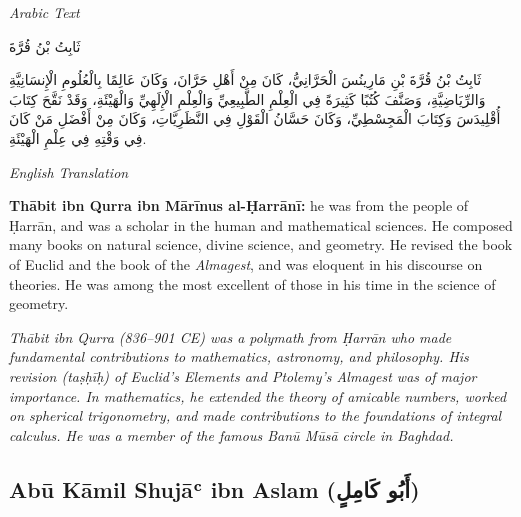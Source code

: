 \documentclass[11pt,a4paper]{article}
\def\RL#1{\beginR#1\endR}
\newcommand{\cnote}[1]{\textcolor{notecolor}{\textit{#1}}}
\newcommand{\textarabic}[1]{{\arabicfont\RL{#1}}}
\newenvironment{arabiccol}{%
  \begin{minipage}[t]{0.48\textwidth}%
  \begin{tcolorbox}[colback=leftbg,colframe=rulecolor,boxrule=0.4pt,arc=2pt,left=5pt,right=5pt,top=5pt,bottom=5pt]%
  \centering\textit{\footnotesize Arabic Text}\\[0.4em]%
  \raggedright\arabicfont\small%
}{%
  \end{tcolorbox}%
  \end{minipage}%
}
\newenvironment{englishcol}{%
  \begin{minipage}[t]{0.48\textwidth}%
  \begin{tcolorbox}[colback=rightbg,colframe=rulecolor,boxrule=0.4pt,arc=2pt,left=5pt,right=5pt,top=5pt,bottom=5pt]%
  \centering\textit{\footnotesize English Translation}\\[0.4em]%
  \raggedright\small%
}{%
  \end{tcolorbox}%
  \end{minipage}%
}
\begin{document}
\noindent
\begin{arabiccol}
\beginR
ثَابِتُ بْنُ قُرَّةَ

ثَابِتُ بْنُ قُرَّةَ بْنِ مَارِينُسَ الْحَرَّانِيُّ، كَانَ مِنْ أَهْلِ حَرَّانَ، وَكَانَ عَالِمًا بِالْعُلُومِ الْإِنسَانِيَّةِ وَالرِّيَاضِيَّةِ، وَصَنَّفَ كُتُبًا كَثِيرَةً فِي الْعِلْمِ الطَّبِيعِيِّ وَالْعِلْمِ الْإِلَهِيِّ وَالْهَيْئَةِ، وَقَدْ نَقَّحَ كِتَابَ أُقْلِيدَسَ وَكِتَابَ الْمَجِسْطِيِّ، وَكَانَ حَسَّانُ الْقَوْلِ فِي النَّظَرِيَّاتِ، وَكَانَ مِنْ أَفْضَلِ مَنْ كَانَ فِي وَقْتِهِ فِي عِلْمِ الْهَيْئَةِ.
\endR
\end{arabiccol}
\hfill
\begin{englishcol}
\textbf{Thābit ibn Qurra ibn Mārīnus al-Ḥarrānī:} he was from the people of Ḥarrān, and was a scholar in the human and mathematical sciences. He composed many books on natural science, divine science, and geometry. He revised the book of Euclid and the book of the \textit{Almagest}, and was eloquent in his discourse on theories. He was among the most excellent of those in his time in the science of geometry.

\cnote{Thābit ibn Qurra (836--901 CE) was a polymath from Ḥarrān who made fundamental contributions to mathematics, astronomy, and philosophy. His revision (\textit{taṣḥīḥ}) of Euclid's \textit{Elements} and Ptolemy's \textit{Almagest} was of major importance. In mathematics, he extended the theory of amicable numbers, worked on spherical trigonometry, and made contributions to the foundations of integral calculus. He was a member of the famous Banū Mūsā circle in Baghdad.}
\end{englishcol}

\par\vspace{0.5em}

\subsection{Abū Kāmil Shujāʿ ibn Aslam (\textarabic{أَبُو كَامِلٍ})}
\end{document}
